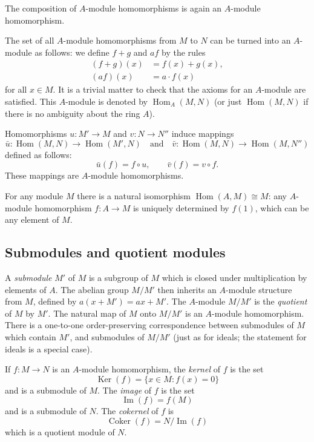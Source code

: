 The composition of \(A\)-module homomorphisms is again an \(A\)-module homomorphism.

The set of all \(A\)-module homomorphisms from \(M\) to \(N\) can be turned into an \(A\)-module as follows: we define \(f+g\) and \(af\) by the rules
\[
\begin{aligned}
(f+g)(x)&=f(x)+g(x),\\
(af)(x)&=a\cdot f(x)
\end{aligned}
\]
for all \(x\in M\). It is a trivial matter to check that the axioms for an \(A\)-module are satisfied. This \(A\)-module is denoted by \(\operatorname{Hom}_A(M,N)\) (or just \(\operatorname{Hom}(M,N)\) if there is no ambiguity about the ring \(A\)).

Homomorphisms \(u:M'\to M\) and \(v:N\to N''\) induce mappings
\[
\bar u:\operatorname{Hom}(M,N)\to\operatorname{Hom}(M',N)
\quad\text{and}\quad
\bar v:\operatorname{Hom}(M,N)\to\operatorname{Hom}(M,N'')
\]
defined as follows:
\[
\bar u(f)=f\circ u,\qquad \bar v(f)=v\circ f.
\]
These mappings are \(A\)-module homomorphisms.

For any module \(M\) there is a natural isomorphism \(\operatorname{Hom}(A,M)\cong M\): any \(A\)-module homomorphism \(f:A\to M\) is uniquely determined by \(f(1)\), which can be any element of \(M\).

\subsection{Submodules and quotient modules}

A \emph{submodule} \(M'\) of \(M\) is a subgroup of \(M\) which is closed under multiplication by elements of \(A\). The abelian group \(M/M'\) then inherits an \(A\)-module structure from \(M\), defined by \(a(x+M')=ax+M'\). The \(A\)-module \(M/M'\) is the \emph{quotient} of \(M\) by \(M'\). The natural map of \(M\) onto \(M/M'\) is an \(A\)-module homomorphism. There is a one-to-one order-preserving correspondence between submodules of \(M\) which contain \(M'\), and submodules of \(M/M'\) (just as for ideals; the statement for ideals is a special case).

If \(f:M\to N\) is an \(A\)-module homomorphism, the \emph{kernel} of \(f\) is the set
\[
\operatorname{Ker}(f)=\{x\in M:f(x)=0\}
\]
and is a submodule of \(M\). The \emph{image} of \(f\) is the set
\[
\operatorname{Im}(f)=f(M)
\]
and is a submodule of \(N\). The \emph{cokernel} of \(f\) is
\[
\operatorname{Coker}(f)=N/\operatorname{Im}(f)
\]
which is a quotient module of \(N\).

